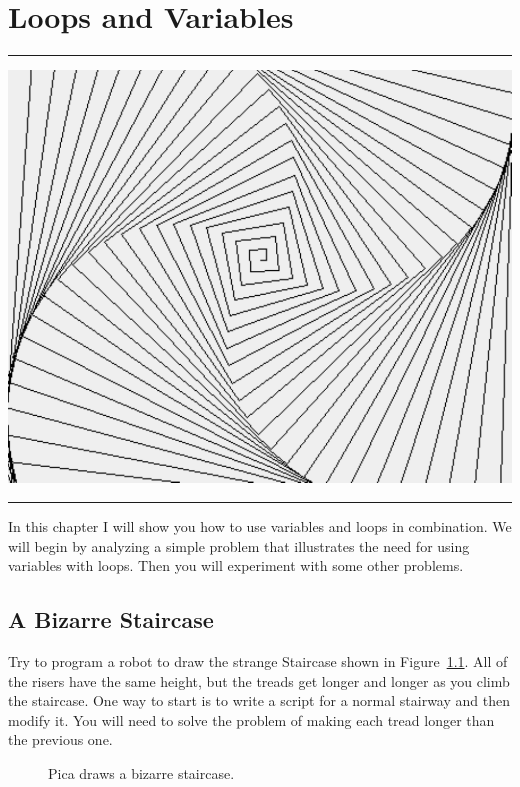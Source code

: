 \documentclass[a4paper,10pt,twoside]{book}
\begin{document}
    \sloppy
\fi

\chapter{Loops and Variables}\label{cha:loopsandvariables}

\noindent\hrule
\includegraphics[width=0.9\linewidth]{c5spiral91}
\noindent\hrule\vspace{1.5cm}

In this chapter I will show you how to use variables and loops in combination. We will begin 
by analyzing a simple problem that illustrates the need for using variables with loops. Then 
you will experiment with some other problems. 

\newpage
\section{A Bizarre Staircase}

Try to program a robot to draw the strange Staircase shown in Figure~\ref{fig:c5escaliertordu}. All of the risers have the same height, but the treads get longer and longer as you climb the staircase. One 
way to start is to write a script for a normal stairway and then modify it. You will need to solve 
the problem of making each tread longer than the previous one.


\begin{figure}[h!]
\caption{Pica draws a bizarre staircase.\label{fig:c5escaliertordu}}
\end{figure}
\end{document}
